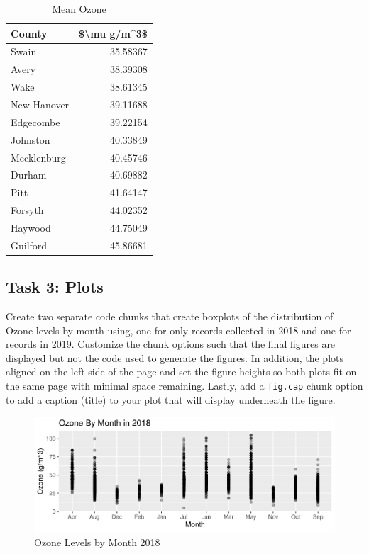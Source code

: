 \documentclass[
]{article}
\begin{document}
\begin{table}

\caption{\label{tab:data.summary}Mean Ozone}
\centering
\begin{tabular}[t]{l|r}
\hline
County & \$\textbackslash{}mu g/m\textasciicircum{}3\$\\
\hline
Swain & 35.58367\\
\hline
Avery & 38.39308\\
\hline
Wake & 38.61345\\
\hline
New Hanover & 39.11688\\
\hline
Edgecombe & 39.22154\\
\hline
Johnston & 40.33849\\
\hline
Mecklenburg & 40.45746\\
\hline
Durham & 40.69882\\
\hline
Pitt & 41.64147\\
\hline
Forsyth & 44.02352\\
\hline
Haywood & 44.75049\\
\hline
Guilford & 45.86681\\
\hline
\end{tabular}
\end{table}

\newpage

\hypertarget{task-3-plots}{%
\subsection{Task 3: Plots}\label{task-3-plots}}

Create two separate code chunks that create boxplots of the distribution
of Ozone levels by month using, one for only records collected in 2018
and one for records in 2019. Customize the chunk options such that the
final figures are displayed but not the code used to generate the
figures. In addition, the plots aligned on the left side of the page and
set the figure heights so both plots fit on the same page with minimal
space remaining. Lastly, add a \texttt{fig.cap} chunk option to add a
caption (title) to your plot that will display underneath the figure.

\begin{figure}

\includegraphics{GriffinBird_A07_Lab_Crafting_Reports_files/figure-latex/Ozone2018-1} \hfill{}

\caption{Ozone Levels by Month 2018}\label{fig:Ozone2018}
\end{figure}
\end{document}
